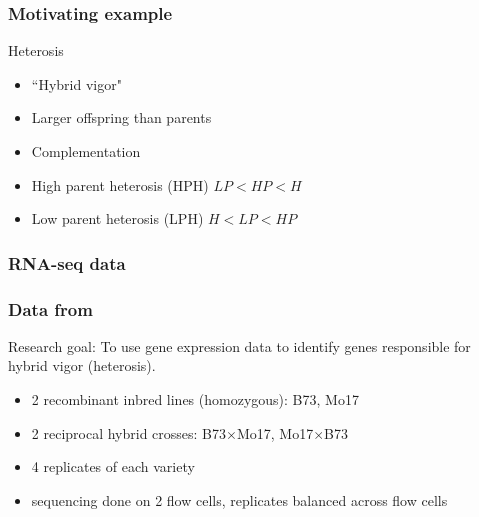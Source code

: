 \documentclass{beamer}
\begin{document}
\begin{frame}[label=current]
\frametitle{Motivating example}
\begin{beamerboxesrounded}[upper=upcol,lower=lowcol,shadow=true]{Heterosis}
\begin{itemize}
\item ``Hybrid vigor"
\pause \item Larger offspring than parents
\pause \item Complementation
\pause \item High parent heterosis (HPH) $LP < HP < H$
\pause \item Low parent heterosis (LPH) $H < LP < HP $
\end{itemize}
\end{beamerboxesrounded}
\end{frame}

\begin{frame}[label=current]
\frametitle{RNA-seq data}

\begin{table}[ht]
\end{table}
\end{frame}

\begin{frame}[label=current]
\frametitle{Data from \citet{paschold}}
Research goal: To use gene expression data to identify genes responsible for hybrid vigor (heterosis).

\pause\begin{beamerboxesrounded}[upper=upcol,lower=lowcol,shadow=true]{}
\begin{itemize}
\item 2 recombinant inbred lines (homozygous): B73, Mo17
\item 2 reciprocal hybrid crosses: B73$\times$Mo17, Mo17$\times$B73
\item 4 replicates of each variety
\item sequencing done on 2 flow cells, replicates balanced across flow cells
\end{itemize}
\end{beamerboxesrounded}
\end{frame}
\end{document}
